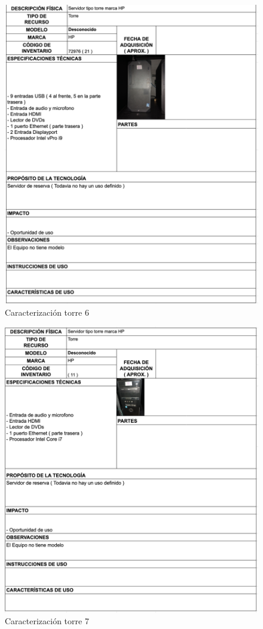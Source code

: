 \begin{figure}[H]
    \centering
    \includegraphics[width=\textwidth] {tablas-images/cp1/torres/torre-6.png}
    \caption{Caracterización torre 6}\label{fig:torre-6}
\end{figure}

\begin{figure}[H]
    \centering
    \includegraphics[width=\textwidth] {tablas-images/cp1/torres/torre-7.png}
    \caption{Caracterización torre 7}\label{fig:torre-7}
\end{figure}

